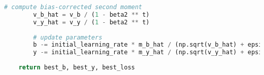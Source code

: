 \begin{appendices}
\begin{lstlisting}[language=Python, caption= null]
        # compute bias-corrected second moment
        v_b_hat = v_b / (1 - beta2 ** t)
        v_y_hat = v_y / (1 - beta2 ** t)
        
        # update parameters
        b -= initial_learning_rate * m_b_hat / (np.sqrt(v_b_hat) + epsilon)
        y -= initial_learning_rate * m_y_hat / (np.sqrt(v_y_hat) + epsilon)
       
    return best_b, best_y, best_loss
\end{lstlisting}

  
\end{appendices}